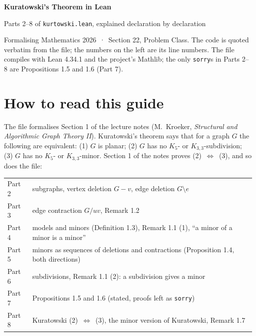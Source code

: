 \documentclass[11pt,a4paper]{article}
\newcommand{\lean}[1]{\texttt{\textcolor{leanink}{#1}}}
\begin{document}
\begin{center}
{\sffamily\bfseries\fontsize{27}{31}\selectfont Kuratowski's Theorem in Lean}\par\medskip
{\large Parts 2--8 of \lean{kurtowski.lean}, explained declaration by declaration}\par\medskip
{\small\color{muted} Formalising Mathematics 2026 \,·\, Section 22, Problem Class.
The code is quoted verbatim from the file; the numbers on the left are its line numbers.
The file compiles with Lean 4.34.1 and the project's Mathlib; the only \lean{sorry}s in Parts 2--8
are Propositions 1.5 and 1.6 (Part 7).}
\end{center}

\setcounter{tocdepth}{2}
{\small\tableofcontents}

\section*{How to read this guide}

The file formalises Section 1 of the lecture notes (M.~Kroeker, \emph{Structural and Algorithmic
Graph Theory II}). Kuratowski's theorem says that for a graph $G$ the following are equivalent:
(1) $G$ is planar; (2) $G$ has no $K_5$- or $K_{3,3}$-subdivision; (3) $G$ has no $K_5$- or
$K_{3,3}$-minor. Section 1 of the notes proves (2)~$\Leftrightarrow$~(3), and so does the file:

\begin{center}\small
\begin{tabularx}{\linewidth}{@{}lL@{}}
\toprule
Part 2 & subgraphs, vertex deletion $G - v$, edge deletion $G \setminus e$\\
Part 3 & edge contraction $G / uv$, Remark 1.2\\
Part 4 & models and minors (Definition 1.3), Remark 1.1 (1), “a minor of a minor is a minor”\\
Part 5 & minors as sequences of deletions and contractions (Proposition 1.4, both directions)\\
Part 6 & subdivisions, Remark 1.1 (2): a subdivision gives a minor\\
Part 7 & Propositions 1.5 and 1.6 (stated, proofs left as \lean{sorry})\\
Part 8 & Kuratowski (2)~$\Leftrightarrow$~(3), the minor version of Kuratowski, Remark 1.7\\
\bottomrule
\end{tabularx}
\end{center}
\end{document}

